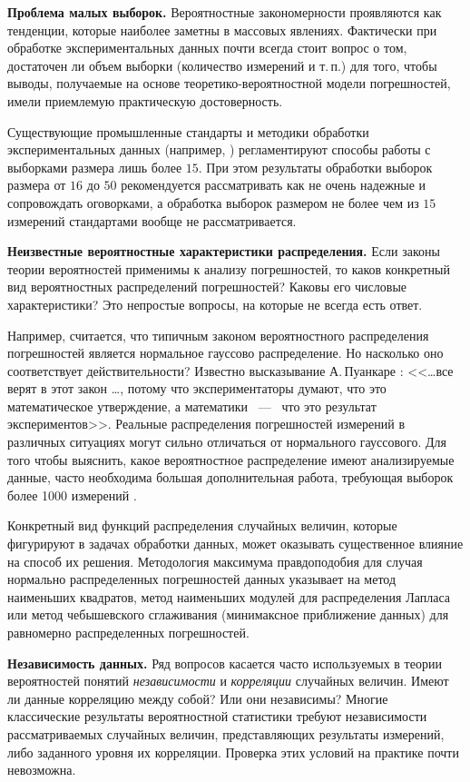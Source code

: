 \documentclass[a5paper,openany]{book}
\begin{document}
{{{\bf Проблема малых выборок.} 
Вероятностные закономерности проявляются как тенденции, которые наиболее заметны 
в массовых явлениях.  Фактически
при обработке экспериментальных данных почти всегда стоит вопрос о том, достаточен ли 
объем выборки (количество измерений и т.\,п.) для того, чтобы выводы, получаемые 
на основе теоретико-вероятностной модели погрешностей, имели приемлемую практическую 
достоверность. 

Существующие промышленные стандарты и методики обработки экспериментальных данных (например, \cite{GUM, JCGM102RU, GOSTDirect}) регламентируют способы работы с выборками размера лишь 
более $15$. При этом результаты обработки выборок размера от $16$ до $50$ рекомендуется 
рассматривать как не очень надежные и сопровождать оговорками, а обработка выборок 
размером не более чем из $15$ измерений стандартами вообще не рассматривается. 

{\bf Неизвестные вероятностные характеристики распределения.} 
Если законы теории вероятностей применимы к анализу погрешностей, то каков конкретный 
вид вероятностных распределений погрешностей? Каковы его числовые характеристики? 
Это непростые вопросы, на которые  не всегда есть ответ.

Например, считается, что типичным законом вероятностного распределения погрешностей 
является нормальное гауссово распределение. Но насколько оно соответствует действительности?   
Известно высказывание А.\,Пуанкаре  \cite{Poincare}: <<\ldots все верят в этот закон  \ldots,  потому что экспериментаторы думают, 
что это математическое утверждение, а математики ~---~ что это результат экспериментов>>.  
Реальные 
распределения погрешностей измерений в различных ситуациях могут сильно отличаться 
от нормального гауссового.
Для того чтобы выяснить, какое вероятностное распределение имеют 
анализируемые данные, часто необходима большая дополнительная работа, требующая выборок более 1000 измерений \cite{Orlov2016}. 

Конкретный вид функций распределения случайных величин, которые фигурируют в задачах 
обработки данных, может оказывать существенное влияние на способ их решения. Методология 
максимума правдоподобия для случая нормально распределенных погрешностей данных указывает на 
метод наименьших квадратов, метод наименьших модулей для распределения Лапласа или метод чебышевского сглаживания (минимаксное приближение данных) для равномерно распределенных погрешностей. 


{\bf Независимость данных.}   
Ряд вопросов касается часто используемых в теории 
вероятностей понятий \emph{независимости} и \emph{корреляции} случайных величин. 
Имеют ли данные корреляцию  между собой? Или  они независимы? Многие классические 
результаты вероятностной статистики требуют  независимости 
рассматриваемых случайных величин, представляющих результаты измерений, либо 
заданного уровня их корреляции. Проверка этих условий на практике почти невозможна. 

}}
\end{document}

